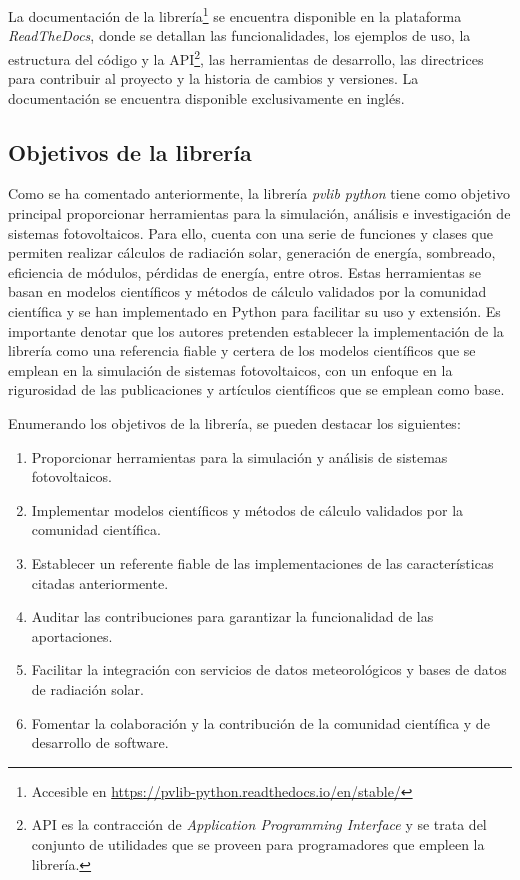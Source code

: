 La documentación de la librería\footnote{Accesible en \url{https://pvlib-python.readthedocs.io/en/stable/}} se encuentra disponible en la plataforma\\ \mbox{\textit{ReadTheDocs}}, donde se detallan las funcionalidades, los ejemplos de uso, la estructura del código y la API\footnote{API es la contracción de \textit{Application Programming Interface} y se trata del conjunto de utilidades que se proveen para programadores que empleen la librería.}, las herramientas de desarrollo, las directrices para contribuir al proyecto y la historia de cambios y versiones. La documentación se encuentra disponible exclusivamente en inglés.

\subsection{Objetivos de la librería} \label{ssct:pvlib:objetivos}

Como se ha comentado anteriormente, la librería \textit{pvlib python} tiene como objetivo principal proporcionar herramientas para la simulación, análisis e investigación de sistemas fotovoltaicos. Para ello, cuenta con una serie de funciones y clases que permiten realizar cálculos de radiación solar, generación de energía, sombreado, eficiencia de módulos, pérdidas de energía, entre otros. Estas herramientas se basan en modelos científicos y métodos de cálculo validados por la comunidad científica y se han implementado en Python para facilitar su uso y extensión. Es importante denotar que los autores pretenden establecer la implementación de la librería como una referencia fiable y certera de los modelos científicos que se emplean en la simulación de sistemas fotovoltaicos, con un enfoque en la rigurosidad de las publicaciones y artículos científicos que se emplean como base.

Enumerando los objetivos de la librería, se pueden destacar los siguientes:

\begin{enumerate}
      \item Proporcionar herramientas para la simulación y análisis de sistemas fotovoltaicos.
      \item Implementar modelos científicos y métodos de cálculo validados por la comunidad científica.
      \item Establecer un referente fiable de las implementaciones de las características citadas anteriormente.
      \item Auditar las contribuciones para garantizar la funcionalidad de las aportaciones.
      \item Facilitar la integración con servicios de datos meteorológicos y bases de datos de radiación solar.
      \item Fomentar la colaboración y la contribución de la comunidad científica y de desarrollo de software.
\end{enumerate}


